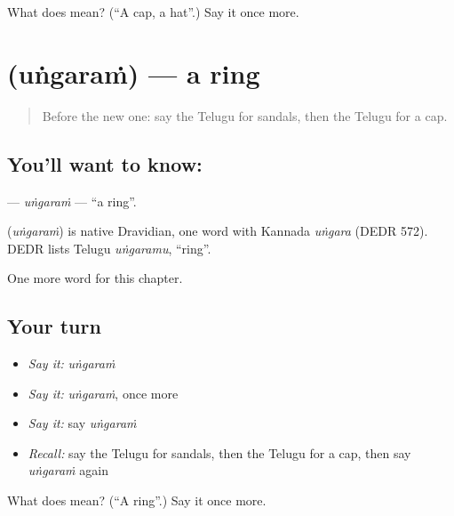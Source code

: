\begin{tcolorbox}[breakable,colback=teal!4,colframe=teal!35!black,title={Before you move on}]
What does  mean? (\textquotedblleft{}A cap, a hat\textquotedblright{}.) Say it once more.
\end{tcolorbox}
\section[\texorpdfstring{\te{ఉంగరం} (uṅgaraṁ)}{ఉంగరం (uṅgaraṁ)}]{ (uṅgaraṁ) — a ring}

\label{lesson:TE-C115-ungaram}



\begin{quote}
Before the new one: say the Telugu for sandals, then the Telugu for a cap.
\end{quote}

\subsection*{You'll want to know: }
\textbf{} — \emph{uṅgaraṁ} — \textquotedblleft{}a ring\textquotedblright{}.

\begin{cousinweb}
\textbf{} (\emph{uṅgaraṁ}) is native Dravidian, one word with Kannada \emph{uṅgara} (DEDR 572). DEDR lists Telugu \emph{uṅgaramu}, \textquotedblleft{}ring\textquotedblright{}.
\end{cousinweb}

\begin{grammarlens}[title={What you've built}]
One more word for this chapter.
\end{grammarlens}

\subsection*{Your turn}
\begin{itemize}
\raggedright
  \item \emph{Say it:} \emph{uṅgaraṁ}
  \item \emph{Say it:} \emph{uṅgaraṁ}, once more
  \item \emph{Say it:} say \emph{uṅgaraṁ}
  \item \emph{Recall:} say the Telugu for sandals, then the Telugu for a cap, then say \emph{uṅgaraṁ} again
\end{itemize}

\begin{tcolorbox}[breakable,colback=teal!4,colframe=teal!35!black,title={Before you move on}]
What does  mean? (\textquotedblleft{}A ring\textquotedblright{}.) Say it once more.
\end{tcolorbox}
